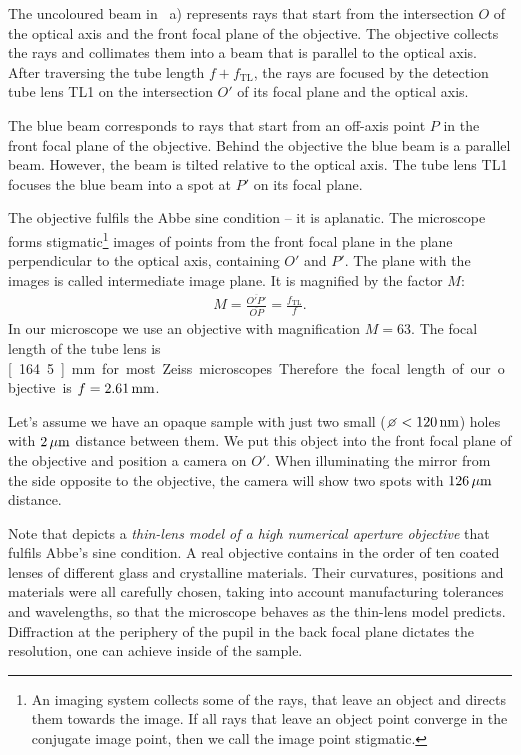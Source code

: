 The uncoloured beam in ~a) represents
rays that start from the intersection $O$ of the optical axis and the
front focal plane of the objective. The objective collects the rays
and collimates them into a beam that is parallel to the optical
axis. After traversing the tube length $f+f_\textrm{TL}$, the rays are
focused by the detection tube lens TL1 on the intersection $O'$ of its
focal plane and the optical axis. 

The blue beam corresponds to rays that start from an off-axis point
$P$ in the front focal plane of the objective. Behind the objective
the blue beam is a parallel beam. However, the beam is tilted relative
to the optical axis. The tube lens TL1 focuses the blue beam into a
spot at $P'$ on its focal plane.

The objective fulfils the Abbe sine condition -- it is aplanatic. The
microscope forms stigmatic\footnote{An imaging system collects some of
  the rays, that leave an object and directs them towards the
  image. If all rays that leave an object point converge in the
  conjugate image point, then we call the image point stigmatic.}
images of points from the front focal plane in the plane perpendicular
to the optical axis, containing $O'$ and $P'$. The plane with the
images is called intermediate image plane. It is magnified by the
factor $M$:
\begin{align}
  M=\frac{\overline{O'P'}}{\overline{OP}}=\frac{f_\textrm{TL}}{f}.
\end{align}
In our microscope we use an objective with magnification $M=63$. The
focal length of the tube lens is \unit[164.5]{mm} for most Zeiss
microscopes. Therefore the focal length of our objective is
$f=\unit[2.61]{mm}$.

Let's assume we have an opaque sample with just two small
($\diameter<\unit[120]{nm}$) holes with $\unit[2]{\mu m}$ distance
between them.  We put this object into the front focal plane of the
objective and position a camera on $O'$. When illuminating the mirror
from the side opposite to the objective, the camera will show two
spots with $\unit[126]{\mu m}$ distance.


Note that  depicts a \emph{thin-lens
  model of a high numerical aperture objective} that fulfils Abbe's
sine condition. A real objective contains in the order of ten coated
lenses of different glass and crystalline materials. Their curvatures,
positions and materials were all carefully chosen, taking into account
manufacturing tolerances and wavelengths, so that the microscope
behaves as the thin-lens model predicts. Diffraction at the periphery
of the pupil in the back focal plane dictates the resolution, one can
achieve inside of the sample.


